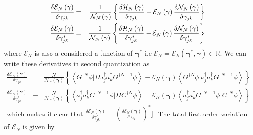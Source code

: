 \documentclass[aps,preprint]{revtex4}
\begin{document}
\begin{eqnarray}
\frac{\delta \mathcal{E}_{N}\left( \mathbf{\gamma }\right) }{\delta \gamma
_{jk}} &=&\frac{1}{\mathcal{N}_{N}\left( \mathbf{\gamma }\right) }\left\{ 
\frac{\delta \mathcal{H}_{N}\left( \mathbf{\gamma }\right) }{\delta \gamma
_{jk}}-\mathcal{E}_{N}\left( \mathbf{\gamma }\right) \frac{\delta \mathcal{N}%
_{N}\left( \mathbf{\gamma }\right) }{\delta \gamma _{jk}}\right\}   \nonumber
\\
\frac{\delta \mathcal{E}_{N}\left( \mathbf{\gamma }\right) }{\delta \gamma
_{jk}^{\ast }} &=&\frac{1}{\mathcal{N}_{N}\left( \mathbf{\gamma }\right) }%
\left\{ \frac{\delta \mathcal{H}_{N}\left( \mathbf{\gamma }\right) }{\delta
\gamma _{jk}^{\ast }}-\mathcal{E}_{N}\left( \mathbf{\gamma }\right) \frac{%
\delta \mathcal{N}_{N}\left( \mathbf{\gamma }\right) }{\delta \gamma
_{jk}^{\ast }}\right\} 
\end{eqnarray}%
where $\mathcal{E}_{N}$ is also a considered a function of $\mathbf{\gamma }%
^{\ast }$ i.e $\mathcal{E}_{N}=\mathcal{E}_{N}\left( \mathbf{\gamma }^{\ast
},\mathbf{\gamma }\right) \in \mathbb{R}$. We can write these derivatives in
second quantization as 
\begin{eqnarray}
\frac{\delta \mathcal{E}_{N}\left( \mathbf{\gamma }\right) }{\delta \gamma
_{jk}} &=&\frac{N}{\mathcal{N}_{N}\left( \mathbf{\gamma }\right) }\left\{
\left\langle G^{\dagger N}\phi |Ha_{j}^{\dagger }a_{k}^{\dagger }G^{\dagger
N-1}\phi \right\rangle -\mathcal{E}_{N}\left( \mathbf{\gamma }\right)
\left\langle G^{\dagger N}\phi |a_{j}^{\dagger }a_{k}^{\dagger }G^{\dagger
N-1}\phi \right\rangle \right\}   \nonumber \\
\frac{\delta \mathcal{E}_{N}\left( \mathbf{\gamma }\right) }{\delta \gamma
_{jk}^{\ast }} &=&\frac{N}{\mathcal{N}_{N}\left( \mathbf{\gamma }\right) }%
\left\{ \left\langle a_{j}^{\dagger }a_{k}^{\dagger }G^{\dagger N-1}\phi
|HG^{\dagger N}\phi \right\rangle -\mathcal{E}_{N}\left( \mathbf{\gamma }%
\right) \left\langle a_{j}^{\dagger }a_{k}^{\dagger }G^{\dagger N-1}\phi
|G^{\dagger N}\phi \right\rangle \right\} 
\end{eqnarray}%
$\lceil $which makes it clear that $\frac{\delta \mathcal{E}_{N}\left( 
\mathbf{\gamma }\right) }{\delta \gamma _{jk}^{\ast }}=\left( \frac{\delta 
\mathcal{E}_{N}\left( \mathbf{\gamma }\right) }{\delta \gamma _{jk}}\right)
^{\ast }\rfloor $. The total first order variation of $\mathcal{E}_{N}$ is
given by 
\end{document}
